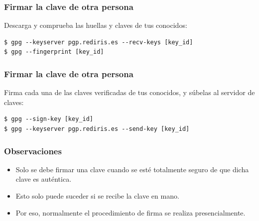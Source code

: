 \documentclass{beamer}
\begin{document}

\begin{frame}[fragile]
\frametitle{Firmar la clave de otra persona}

Descarga y comprueba las huellas y claves de tus conocidos:



\begin{lstlisting}[frame=trBL]
$ gpg --keyserver pgp.rediris.es --recv-keys [key_id]
$ gpg --fingerprint [key_id]
\end{lstlisting}

\end{frame}


\begin{frame}[fragile]
\frametitle{Firmar la clave de otra persona}

Firma cada una de las claves \alert{verificadas} de tus conocidos, y súbelas al servidor de claves:



\begin{lstlisting}[frame=trBL]
$ gpg --sign-key [key_id]
$ gpg --keyserver pgp.rediris.es --send-key [key_id]
\end{lstlisting}

\end{frame}



\begin{frame}
\frametitle{Observaciones}

\begin{itemize}
\item Solo se debe firmar una clave cuando se esté totalmente seguro de que dicha clave es auténtica. 
\item Esto solo puede suceder si se recibe la clave en mano. 
\item Por eso, normalmente el procedimiento de firma se realiza presencialmente.
\end{itemize}

\end{frame}
\end{document}
